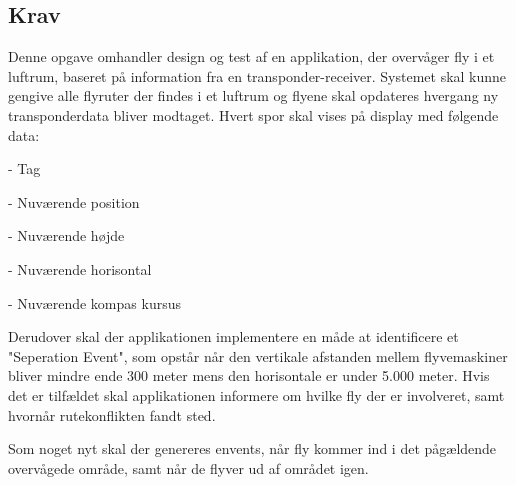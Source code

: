 \subsection{Krav}
Denne opgave omhandler design og test af en applikation, der overvåger fly i et luftrum, baseret på information fra en transponder-receiver. 
Systemet skal kunne gengive alle flyruter der findes i et luftrum og flyene skal opdateres hvergang ny transponderdata bliver modtaget. Hvert spor skal vises på display med følgende data: 

- Tag

- Nuværende position

- Nuværende højde

- Nuværende horisontal

- Nuværende kompas kursus

Derudover skal der applikationen implementere en måde at identificere et "Seperation Event", som opstår når den vertikale afstanden mellem flyvemaskiner bliver mindre ende 300 meter mens den horisontale er under 5.000 meter. 
Hvis det er tilfældet skal applikationen informere om hvilke fly der er involveret, samt hvornår rutekonflikten fandt sted.

Som noget nyt skal der genereres envents, når fly kommer ind i det pågældende overvågede område, samt når de flyver ud af området igen.


